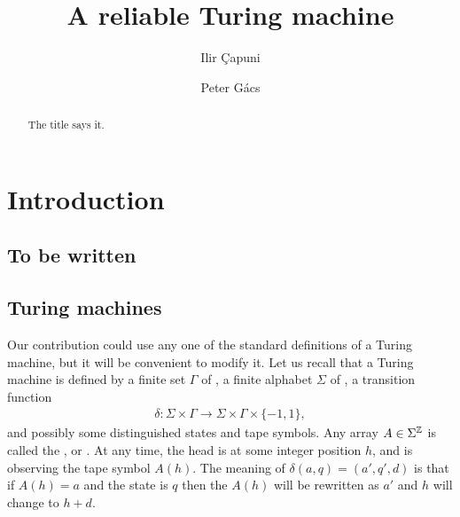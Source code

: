 \documentclass[11pt]{memoir}
\theoremstyle{definition} %
\newcommand{\h}{h}
\begin{document}
\title{A reliable Turing machine}

\author{Ilir \c{C}apuni \and Peter G\'acs}

\maketitle

\begin{abstract}
The title says it.
\end{abstract}

\tableofcontents*

\section{Introduction}

\subsection{To be written}

\subsection{Turing machines}\label{sec:TM}

Our contribution could use any one of the standard definitions of a Turing machine, but it will
be convenient to modify it.
Let us recall that a Turing machine is defined by a finite set \( \Gamma \) of ,
a finite alphabet \( \Sigma \) of , a transition function
\begin{align*}
             \delta\colon\Sigma\times \Gamma\to \Sigma\times\Gamma\times\{-1,1\},
\end{align*}
and possibly some distinguished states and tape symbols.
Any array \( A\in\Sigma^{\mathbb{Z}} \) is called the , or .
At any time, the head is at some integer position \( \h \), and is observing the tape
symbol \( A(\h) \).
The meaning of \( \delta(a,q)=(a',q',d) \) is that if \( A(\h)=a \) and the state is \( q \) then
the \( A(\h) \) will be rewritten as \( a' \) and \( \h \) will change to \( \h+d \).
\end{document}
